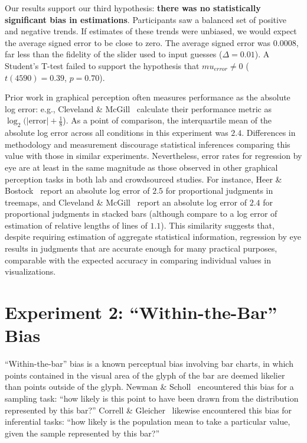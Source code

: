 \documentclass{sigchi}
\begin{document}
Our results support our third hypothesis: \textbf{there was no statistically significant bias in estimations}. Participants saw a balanced set of positive and negative trends. If estimates of these trends were unbiased, we would expect the average signed error to be close to zero. The average signed error was $0.0008$, far less than the fidelity of the slider used to input guesses ($\Delta=0.01$). A Student's T-test failed to support the hypothesis that $mu_{error}\ne0$ ($t(4590) = 0.39$, $p=0.70$).

Prior work in graphical perception often measures performance as the absolute log error: e.g., Cleveland \& McGill~\cite{cleveland1984graphical} calculate their performance metric as $\log_2 (|\text{error}| + \frac{1}{8}$). As a point of comparison, the interquartile mean of the absolute log error across all conditions in this experiment was $2.4$. Differences in methodology and measurement discourage statistical inferences comparing this value with those in similar experiments. Nevertheless, error rates for regression by eye are at least in the same magnitude as those observed in other graphical perception tasks in both lab and crowdsourced studies. For instance, Heer \& Bostock~\cite{heer2010crowdsourcing} report an absolute log error of $2.5$ for proportional judgments in treemaps, and Cleveland \& McGill~\cite{cleveland1984graphical} report an absolute log error of $2.4$ for proportional judgments in stacked bars (although compare to a log error of estimation of relative lengths of lines of $1.1$). This similarity suggests that, despite requiring estimation of aggregate statistical information, regression by eye results in judgments that are accurate enough for many practical purposes, comparable with the expected accuracy in comparing individual values in visualizations. 

\section{Experiment 2: ``Within-the-Bar'' Bias}

\expTwoTypesFig

``Within-the-bar'' bias is a known perceptual bias involving bar charts, in which points contained in the visual area of the glyph of the bar are deemed likelier than points outside of the glyph. Newman \& Scholl~\cite{newman2012bar} encountered this bias for a sampling task: ``how likely is this point to have been drawn from the distribution represented by this bar?'' Correll \& Gleicher~\cite{correll2014error} likewise encountered this bias for inferential tasks: ``how likely is the population mean to take a particular value, given the sample represented by this bar?''
\end{document}
